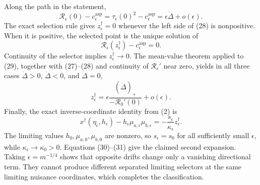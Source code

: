 Along the path in the statement,
\[
\mathcal R_\epsilon(0)-c_\epsilon^{\mathrm{asp}}
=\tau_\epsilon(0)^2-c_\epsilon^{\mathrm{asp}}
=\epsilon\dot\Delta+o(\epsilon). \tag{28}
\]
The exact selection rule gives \(z^\dagger_\epsilon=0\) whenever the left side of (28) is nonpositive.  When it is positive, the selected point is the unique solution of
\[
\mathcal R_\epsilon(z^\dagger_\epsilon)-c_\epsilon^{\mathrm{asp}}=0. \tag{29}
\]
Continuity of the selector implies
\(z^\dagger_\epsilon\to0\).  The mean-value theorem applied to (29), together with (27)--(28) and continuity of
\(\mathcal R_\epsilon'\) near zero, yields in all three cases
\(\dot\Delta>0\), \(\dot\Delta<0\), and \(\dot\Delta=0\),
\[
z^\dagger_\epsilon
=\epsilon\frac{(\dot\Delta)_+}{-\mathcal R_0'(0)}
+o(\epsilon). \tag{30}
\]
Finally, the exact inverse-coordinate identity from (2) is
\[
x^\dagger(\eta_\epsilon,h_\epsilon)
-h_\epsilon\mu_{a,\epsilon}\mu_{b,\epsilon}
=-\frac{s_\epsilon}{\kappa_\epsilon}z^\dagger_\epsilon. \tag{31}
\]
The limiting values \(h_0,\mu_{a,0},\mu_{b,0}\) are nonzero, so
\(s_\epsilon=s_0\) for all sufficiently small \(\epsilon\), while
\(\kappa_\epsilon\to\kappa_0>0\).  Equations (30)--(31) give the claimed second expansion.  Taking \(\epsilon=m^{-1/4}\) shows that opposite drifts change only a vanishing directional term.  They cannot produce different separated limiting selectors at the same limiting nuisance coordinates, which completes the classification.
